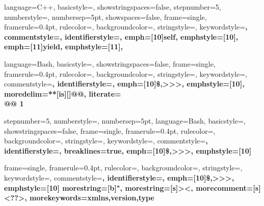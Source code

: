 {
  language=C++,
  basicstyle=\small,
  showstringspaces=false,
  stepnumber=5,
  numberstyle=\tiny,
  numbersep=5pt,
  showspaces=false,
  frame=single,
  framerule=0.4pt,
  rulecolor=\color{pgrey},
  backgroundcolor=\color{white},
  stringstyle=\color{BrickRed},
  keywordstyle=\color{BlueViolet}\bfseries,
  commentstyle=\color{PineGreen}\bfseries,
  identifierstyle={},
  emph={[10]self}, emphstyle={[10]\color{pblue}},
  emph={[11]yield}, emphstyle={[11]\color{pblue}},
}

\newcommand{\CC}{C\nolinebreak\hspace{-.05em}\raisebox{1ex}{\tiny\bf +}\nolinebreak\hspace{-.10em}\raisebox{1ex}{\tiny\bf +}}

{
  language=Bash,
  basicstyle=\ttfamily\small,
  showstringspaces=false,
  frame=single,
  framerule=0.4pt,
  rulecolor=\color{pgrey},
  backgroundcolor=\color{plightgrey2},
  stringstyle=\color{BrickRed},
  keywordstyle=\color{BlueViolet},
  commentstyle=\color{PineGreen}\bfseries,
  identifierstyle=\color{black},
  emph={[10]\$,>>>}, emphstyle={[10]\color{pblue}},
  moredelim=**[is][\bfseries\color{red}]{@}{@},
  literate={\\@}{{\makeatletter @ \makeatother}}1
}

{ 
  stepnumber=5,
  numberstyle=\tiny,
  numbersep=5pt,
  language=Bash,
  basicstyle=\ttfamily\small,
  showstringspaces=false,
  frame=single,
  framerule=0.4pt,
  rulecolor=\color{pgrey},
  backgroundcolor=\color{plightgrey2},
  stringstyle=\color{black},
  keywordstyle=\color{black},
  commentstyle=\color{blue}\bfseries,
  identifierstyle=\color{black},
  breaklines=true,
  emph={[10]\$,>>>}, emphstyle={[10]\color{pblue}}
}

{
  frame=single,
  framerule=0.4pt,
  rulecolor=\color{pgrey},
  backgroundcolor=\color{plightgrey2},
  stringstyle=\color{black},
  keywordstyle=\color{black},
  commentstyle=\color{blue}\bfseries,
  identifierstyle=\color{black},
  emph={[10]\$,>>>}, emphstyle={[10]\color{pblue}}
  morestring=[b]",
  morestring=[s]{>}{<},
  morecomment=[s]{<?}{?>},
  morekeywords={xmlns,version,type}%
}

\newcommand{\bibtex}{\textsc{Bib}\TeX}

\newcommand{\LinkSymbol}{%
  \tikz[x=1.2ex, y=1.2ex, baseline=-0.05ex]{%
    \begin{scope}[x=1ex, y=1ex]
      \clip (-0.1,-0.1) 
      --++ (-0, 1.2) 
      --++ (0.6, 0) 
      --++ (0, -0.6) 
      --++ (0.6, 0) 
      --++ (0, -1);
      \path[draw, 
      line width = 0.5, 
      rounded corners=0.5] 
      (0,0) rectangle (1,1);
    \end{scope}
    \path[draw, line width = 0.5] (0.5, 0.5) 
    -- (1, 1);
    \path[draw, line width = 0.5] (0.6, 1) 
    -- (1, 1) -- (1, 0.6);
  }
}
\newcommand{\lhref}[2]{\href{#1}{#2\,\LinkSymbol}}

